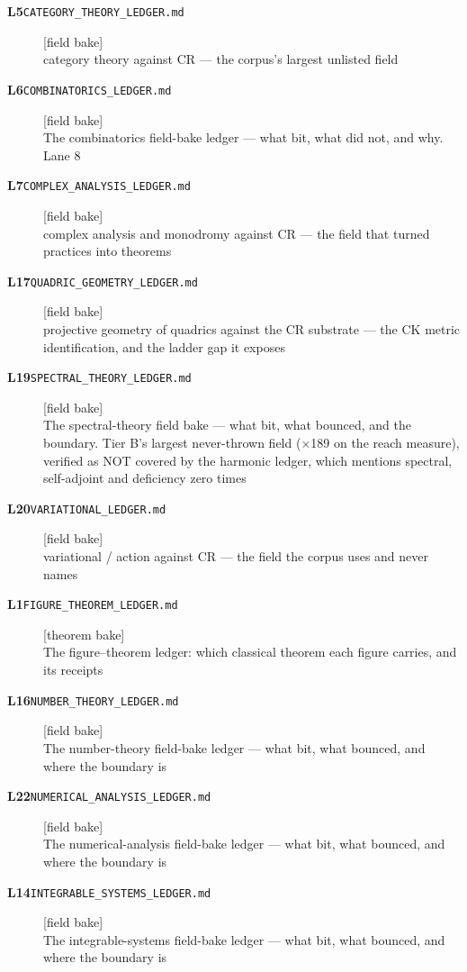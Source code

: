 \begin{description}
\item[\textbf{L5}\quad\texttt{CATEGORY\_THEORY\_LEDGER.md}]\hfill\textsf{[field bake]}\\
category theory against CR --- the corpus's largest unlisted field
\item[\textbf{L6}\quad\texttt{COMBINATORICS\_LEDGER.md}]\hfill\textsf{[field bake]}\\
The combinatorics field-bake ledger --- what bit, what did not, and why. Lane 8
\item[\textbf{L7}\quad\texttt{COMPLEX\_ANALYSIS\_LEDGER.md}]\hfill\textsf{[field bake]}\\
complex analysis and monodromy against CR --- the field that turned practices into theorems
\item[\textbf{L17}\quad\texttt{QUADRIC\_GEOMETRY\_LEDGER.md}]\hfill\textsf{[field bake]}\\
projective geometry of quadrics against the CR substrate --- the CK metric identification, and the ladder gap it exposes
\item[\textbf{L19}\quad\texttt{SPECTRAL\_THEORY\_LEDGER.md}]\hfill\textsf{[field bake]}\\
The spectral-theory field bake --- what bit, what bounced, and the boundary. Tier B's largest never-thrown field ($\times$189 on the reach measure), verified as NOT covered by the harmonic ledger, which mentions spectral, self-adjoint and deficiency zero times
\item[\textbf{L20}\quad\texttt{VARIATIONAL\_LEDGER.md}]\hfill\textsf{[field bake]}\\
variational / action against CR --- the field the corpus uses and never names
\item[\textbf{L1}\quad\texttt{FIGURE\_THEOREM\_LEDGER.md}]\hfill\textsf{[theorem bake]}\\
The figure--theorem ledger: which classical theorem each figure carries, and its receipts
\item[\textbf{L16}\quad\texttt{NUMBER\_THEORY\_LEDGER.md}]\hfill\textsf{[field bake]}\\
The number-theory field-bake ledger --- what bit, what bounced, and where the boundary is
\item[\textbf{L22}\quad\texttt{NUMERICAL\_ANALYSIS\_LEDGER.md}]\hfill\textsf{[field bake]}\\
The numerical-analysis field-bake ledger --- what bit, what bounced, and where the boundary is
\item[\textbf{L14}\quad\texttt{INTEGRABLE\_SYSTEMS\_LEDGER.md}]\hfill\textsf{[field bake]}\\
The integrable-systems field-bake ledger --- what bit, what bounced, and where the boundary is
\end{description}
\endgroup
